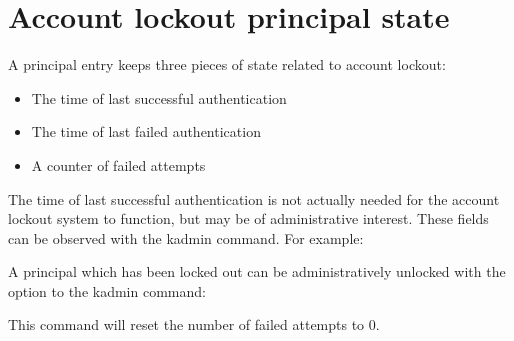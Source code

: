 \documentclass[letterpaper,10pt,english]{sphinxmanual}
\begin{document}
\section{Account lockout principal state}
\label{\detokenize{admin/lockout:account-lockout-principal-state}}
A principal entry keeps three pieces of state related to account
lockout:
\begin{itemize}
\item {} 
The time of last successful authentication

\item {} 
The time of last failed authentication

\item {} 
A counter of failed attempts

\end{itemize}

The time of last successful authentication is not actually needed for
the account lockout system to function, but may be of administrative
interest.  These fields can be observed with the  kadmin
command.  For example:

%
\begin{sphinxVerbatim}[commandchars=\\\{\}]
  
 
   \PYG{p}{[}\PYG{p}{]}
        
   
\end{sphinxVerbatim}

A principal which has been locked out can be administratively unlocked
with the  option to the  kadmin command:

%
\begin{sphinxVerbatim}[commandchars=\\\{\}]
   
\end{sphinxVerbatim}

This command will reset the number of failed attempts to 0.
\end{document}
